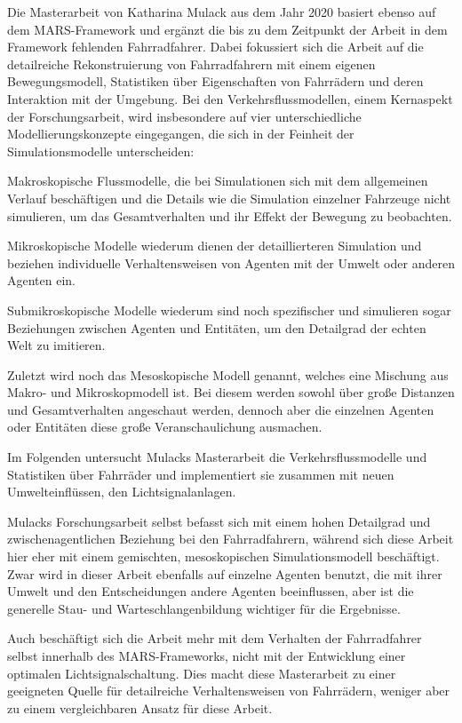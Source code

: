 Die Masterarbeit von Katharina Mulack aus dem Jahr 2020 basiert ebenso auf dem MARS-Framework und ergänzt die bis zu dem Zeitpunkt der Arbeit in dem Framework fehlenden Fahrradfahrer.
Dabei fokussiert sich die Arbeit auf die detailreiche Rekonstruierung von Fahrradfahrern mit einem eigenen Bewegungsmodell, Statistiken über Eigenschaften von Fahrrädern und deren Interaktion mit der Umgebung\cite{Mulack2020}.
Bei den Verkehrsflussmodellen, einem Kernaspekt der Forschungsarbeit, wird insbesondere auf vier unterschiedliche Modellierungskonzepte eingegangen, die sich in der Feinheit der Simulationsmodelle unterscheiden:

Makroskopische Flussmodelle, die bei Simulationen sich mit dem allgemeinen Verlauf beschäftigen und die Details wie die Simulation einzelner Fahrzeuge nicht simulieren, um das Gesamtverhalten und ihr Effekt der Bewegung zu beobachten\cite[S. 6]{Mulack2020}.

Mikroskopische Modelle wiederum dienen der detaillierteren Simulation und beziehen individuelle Verhaltensweisen von Agenten mit der Umwelt oder anderen Agenten ein\cite[S. 6 f]{Mulack2020}.

Submikroskopische Modelle wiederum sind noch spezifischer und simulieren sogar Beziehungen zwischen Agenten und Entitäten, um den Detailgrad der echten Welt zu imitieren\cite[S. 7]{Mulack2020}.

Zuletzt wird noch das Mesoskopische Modell genannt, welches eine Mischung aus Makro- und Mikroskopmodell ist.
Bei diesem werden sowohl über große Distanzen und Gesamtverhalten angeschaut werden, dennoch aber die einzelnen Agenten oder Entitäten diese große Veranschaulichung ausmachen\cite[S. 7]{Mulack2020}.

Im Folgenden untersucht Mulacks Masterarbeit die Verkehrsflussmodelle und Statistiken über Fahrräder und implementiert sie zusammen mit neuen Umwelteinflüssen, den Lichtsignalanlagen.

Mulacks Forschungsarbeit selbst befasst sich mit einem hohen Detailgrad und zwischenagentlichen Beziehung bei den Fahrradfahrern, während sich diese Arbeit hier eher mit einem gemischten, mesoskopischen Simulationsmodell beschäftigt.
Zwar wird in dieser Arbeit ebenfalls auf einzelne Agenten benutzt, die mit ihrer Umwelt und den Entscheidungen andere Agenten beeinflussen, aber ist die generelle Stau- und Warteschlangenbildung wichtiger für die Ergebnisse.

Auch beschäftigt sich die Arbeit mehr mit dem Verhalten der Fahrradfahrer selbst innerhalb des MARS-Frameworks, nicht mit der Entwicklung einer optimalen Lichtsignalschaltung.
Dies macht diese Masterarbeit zu einer geeigneten Quelle für detailreiche Verhaltensweisen von Fahrrädern, weniger aber zu einem vergleichbaren Ansatz für diese Arbeit.
